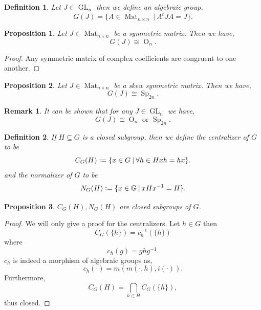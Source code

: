 \documentclass[10pt]{article}
\newtheorem{proposition}{Proposition}[section]
\newtheorem{definition}{Definition}[section]
\newtheorem{remark}{Remark}[section]
\numberwithin{equation}{theorem}
\DeclareMathOperator{\GL}{GL}
\DeclareMathOperator{\Orth}{O}
\DeclareMathOperator{\Sp}{Sp}
\DeclareMathOperator{\Mat}{Mat}
\newcommand{\defeq}{\vcentcolon=}
\newcommand{\G}[0]{\mathbb{G}}
\newcommand{\sep}[0]{\:|\:}
\newcommand{\smat}[1][n]{\Mat_{#1\times #1}}
\begin{document}
\begin{definition}
  Let $J\in\GL_n$ then we define an algebraic group,
  \begin{equation*}
    G(J) = \{A\in\Mat_{n\times n}\sep A^tJA = J\}. 
  \end{equation*}
\end{definition}
\begin{proposition}
  Let $J\in\smat$ be a symmetric matrix. Then we have,
  \begin{equation*}
    G(J)\cong \Orth_n.
  \end{equation*}
\end{proposition}
\begin{proof}
Any symmetric matrix of complex coefficients are congruent to one another.
\end{proof}
\begin{proposition}
  Let $J\in\smat$ be a skew symmetric matrix. Then we have,
  \begin{equation*}
    G(J) \cong \Sp_{2n}.
  \end{equation*}
\end{proposition}

\begin{remark}
  It can be shown that for any $J\in\GL_n$ we have, 
  \begin{equation*}
    G(J)\cong\Orth_n\text{ or }\Sp_{2n}.
  \end{equation*}
\end{remark}

\begin{definition}
  If $H\subseteq G$ is a closed subgroup, then we define the centralizer of $G$ to be 
  \begin{equation*}
    C_G(H) \defeq \{x\in G\sep \forall h\in Hxh = hx\}.
  \end{equation*}
  and the normalizer of $G$ to be
  \begin{equation*}
    N_G(H) \defeq \{x\in\G\sep xHx^{-1} = H\}.
  \end{equation*}
\end{definition}

\begin{proposition}
  $C_G(H),N_G(H)$ are closed subgroups of $G$.
\end{proposition}
\begin{proof}
  We will only give a proof for the centralizers.
  Let $h\in G$ then 
  \begin{equation*}
    C_G(\{h\}) = c_h^{-1}(\{h\})
  \end{equation*}
  where 
  \begin{equation*}
    c_h(g) = ghg^{-1}.
  \end{equation*}
  $c_h$ is indeed a morphism of algebraic groups as,
  \begin{equation*}
    c_h(\cdot) = m(m(\cdot,h),i(\cdot)).
  \end{equation*}
  Furthermore,
  \begin{equation*}
    C_G(H) = \bigcap_{h\in H}C_G(\{h\}),
  \end{equation*}
  thus closed.
\end{proof}
\end{document}
